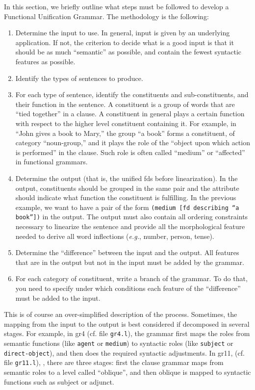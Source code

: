 \documentclass[10pt,a4paper]{report}
\begin{document}
In this section, we briefly outline what steps must be followed to develop
a Functional Unification Grammar. The methodology is the following:
\begin{enumerate}
\item Determine the input to use.  In general, input is given by an underlying
application.  If not, the criterion to decide what is a good input is that
it should be as much ``semantic'' as possible, and contain the fewest
syntactic features as possible.

\item Identify the types of sentences to produce.

\item For each type of sentence, identify the constituents and sub-constituents,
and their function in the sentence.  A constituent is a group of words that
are ``tied together'' in a clause.  A constituent in general plays a
certain function with respect to the higher level constituent containing
it.  For example, in ``John gives a book to Mary,'' the group ``a book''
forms a constituent, of category ``noun-group,'' and it plays the role of
the ``object upon which action is performed'' in the clause.  Such role is
often called ``medium'' or ``affected'' in functional grammars.

\item Determine the output (that is, the unified fds before linearization).
In the output, constituents should be grouped in the same pair and the
attribute should indicate what function the constituent is fulfilling.
In the previous example, we want to have a pair of the form {\tt (medium [fd
describing ``a book''])} in the output.  The output must also contain all
ordering constraints necessary to linearize the sentence and provide all
the morphological feature needed to derive all word inflections ({\em e.g.}, 
number, person, tense).

\item Determine the ``difference'' between the input and the output.  All
features that are in the output but not in the input must be added by the
grammar. 

\item For each category of constituent, write a branch of the grammar.  To do
that, you need to specify under which conditions each feature of the
``difference'' must be added to the input.
\end{enumerate}

This is of course an over-simplified description of the process.
Sometimes, the mapping from the input to the output is best considered if
decomposed in several stages.  For example, in gr4 (cf. file
{\tt gr4.l}),  the grammar first maps the roles from
semantic functions (like {\tt agent} or {\tt medium}) to syntactic roles (like
{\tt subject} or {\tt direct-object}), and then does the required syntactic
adjustments.   In gr11, (cf. file {\tt gr11.l}), , there
are three stages: first the clause grammar maps from semantic roles to a
level called ``oblique'', and then oblique is mapped to syntactic functions
such as subject or adjunct.  
\end{document}
